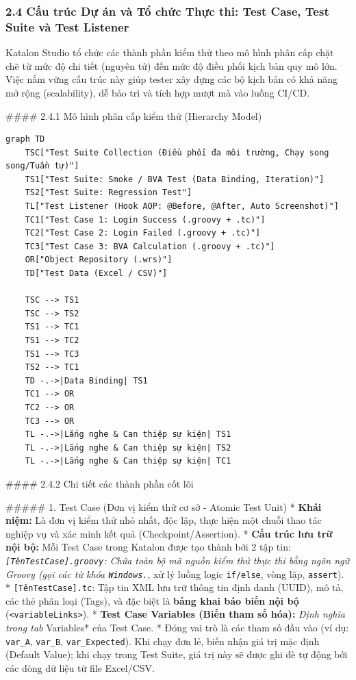 {\subsubsection{2.4 Cấu trúc Dự án và Tổ chức Thực thi: Test Case, Test Suite và Test Listener}

Katalon Studio tổ chức các thành phần kiểm thử theo mô hình phân cấp chặt chẽ từ mức độ chi tiết (nguyên tử) đến mức độ điều phối kịch bản quy mô lớn. Việc nắm vững cấu trúc này giúp tester xây dựng các bộ kịch bản có khả năng mở rộng (scalability), dễ bảo trì và tích hợp mượt mà vào luồng CI/CD.

#### 2.4.1 Mô hình phân cấp kiểm thử (Hierarchy Model)

\begin{lstlisting}
graph TD
    TSC["Test Suite Collection (Điều phối đa môi trường, Chạy song song/Tuần tự)"]
    TS1["Test Suite: Smoke / BVA Test (Data Binding, Iteration)"]
    TS2["Test Suite: Regression Test"]
    TL["Test Listener (Hook AOP: @Before, @After, Auto Screenshot)"]
    TC1["Test Case 1: Login Success (.groovy + .tc)"]
    TC2["Test Case 2: Login Failed (.groovy + .tc)"]
    TC3["Test Case 3: BVA Calculation (.groovy + .tc)"]
    OR["Object Repository (.wrs)"]
    TD["Test Data (Excel / CSV)"]

    TSC --> TS1
    TSC --> TS2
    TS1 --> TC1
    TS1 --> TC2
    TS1 --> TC3
    TS2 --> TC1
    TD -.->|Data Binding| TS1
    TC1 --> OR
    TC2 --> OR
    TC3 --> OR
    TL -.->|Lắng nghe & Can thiệp sự kiện| TS1
    TL -.->|Lắng nghe & Can thiệp sự kiện| TS2
    TL -.->|Lắng nghe & Can thiệp sự kiện| TC1
\end{lstlisting}


#### 2.4.2 Chi tiết các thành phần cốt lõi

##### 1. Test Case (Đơn vị kiểm thử cơ sở - Atomic Test Unit)
* \textbf{Khái niệm:} Là đơn vị kiểm thử nhỏ nhất, độc lập, thực hiện một chuỗi thao tác nghiệp vụ và xác minh kết quả (Checkpoint/Assertion).
* \textbf{Cấu trúc lưu trữ nội bộ:} Mỗi Test Case trong Katalon được tạo thành bởi 2 tập tin:
  \textit{ \texttt{[TênTestCase].groovy}: Chứa toàn bộ mã nguồn kiểm thử thực thi bằng ngôn ngữ Groovy (gọi các từ khóa \texttt{Windows.}}, xử lý luồng logic \texttt{if/else}, vòng lặp, \texttt{assert}).
  * \texttt{[TênTestCase].tc}: Tập tin XML lưu trữ thông tin định danh (UUID), mô tả, các thẻ phân loại (Tags), và đặc biệt là \textbf{bảng khai báo biến nội bộ} (\texttt{<variableLinks>}).
* \textbf{Test Case Variables (Biến tham số hóa):}
  \textit{ Định nghĩa trong tab }Variables* của Test Case.
  * Đóng vai trò là các tham số đầu vào (ví dụ: \texttt{var_A}, \texttt{var_B}, \texttt{var_Expected}). Khi chạy đơn lẻ, biến nhận giá trị mặc định (Default Value); khi chạy trong Test Suite, giá trị này sẽ được ghi đè tự động bởi các dòng dữ liệu từ file Excel/CSV.

}
